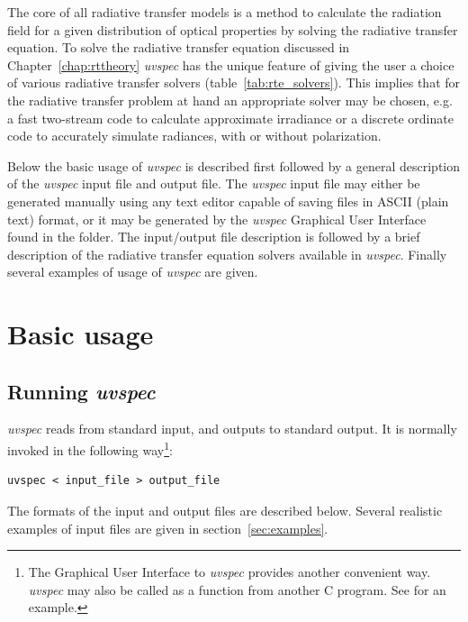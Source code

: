 The core of all radiative transfer models is a method to calculate the
radiation field for a given distribution of optical properties by
solving the radiative transfer equation. To solve the radiative
transfer equation discussed in Chapter~\ref{chap:rttheory} 
{\sl uvspec} has the unique feature of giving the user a choice of
various  radiative transfer solvers (table~\ref{tab:rte_solvers}).
This implies that for the radiative transfer problem at hand an
appropriate solver may 
be chosen, e.g. a fast two-stream code to calculate approximate
irradiance or a discrete ordinate code to accurately simulate
radiances, with or without polarization. 

Below the basic usage of {\sl uvspec} is described first followed by
a general description of the {\sl uvspec} input file and output file. The
{\sl uvspec} input file may either be generated manually using any
text editor capable of saving files in ASCII (plain text) format, or
it may be generated by the {\sl uvspec} Graphical User Interface
found in the  folder. The input/output file description is 
followed by a brief description of the radiative transfer equation solvers 
available in {\sl uvspec}. Finally several examples of usage of {\sl uvspec} 
are given.

\section{Basic usage}

\subsection{Running {\sl uvspec}}

{\sl uvspec} reads 
from standard input, and outputs to standard output. It is normally
invoked in the following way\footnote{The Graphical User Interface to
{\sl uvspec} provides another convenient way.  {\sl uvspec}
may also be called as a function from another C program. See
 for an example.}:

\begin{Verbatim}[fontsize=\footnotesize] 
  uvspec < input_file > output_file
\end{Verbatim}
  
\noindent The formats of the input and output files are described
below. Several realistic examples of input files are 
given in section~\ref{sec:examples}.

